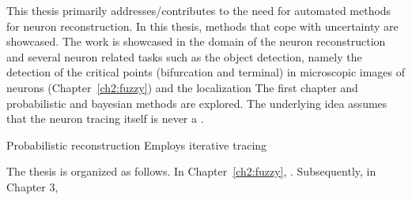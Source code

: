 This thesis primarily addresses/contributes to the need for automated methods for neuron reconstruction. 
In this thesis, methods that cope with uncertainty are showcased. The work is showcased in the domain of the neuron reconstruction and several neuron related tasks such as the object detection, namely the detection of the critical points (bifurcation and terminal) in microscopic images of neurons (Chapter~\ref{ch2:fuzzy}) and the localization  The first chapter  and probabilistic and bayesian methods are explored. The underlying idea assumes that the neuron tracing itself is never a .

Probabilistic reconstruction
Employs iterative tracing


The thesis is organized as follows. In Chapter~\ref{ch2:fuzzy},  . Subsequently, in Chapter 3, 

